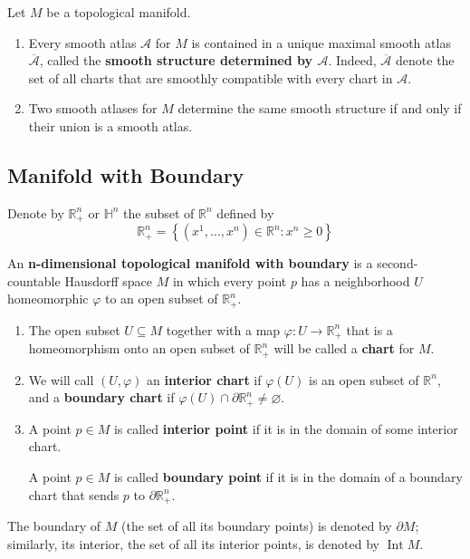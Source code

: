\documentclass[12pt, oneside]{book}
\begin{document}
\begin{proposition}
    Let $M$ be a topological manifold.
    \begin{enumerate}
        \item
              Every smooth atlas $\mathcal{A}$ for $M$ is contained in a unique maximal smooth atlas $\overline{\mathcal{A}}$, called the \textbf{smooth structure determined by $\mathcal{A}$}. Indeed, $\overline{\mathcal{A}}$ denote the set of all charts that
              are smoothly compatible with every chart in $\mathcal{A}$.

        \item
              Two smooth atlases for $M$ determine the same smooth structure if and only if
              their union is a smooth atlas.
    \end{enumerate}
\end{proposition}




\subsection{Manifold with Boundary}
Denote by $\mathbb{R}^n_+$ or $\mathbb{H}^n$ the subset of $\mathbb{R}^n$ defined by
\begin{equation*}
    \mathbb{R}^n_+=\left\{\left(x^1, \ldots, x^n\right) \in \mathbb{R}^n: x^n \geq 0\right\}
\end{equation*}



\begin{definition}
    An \textbf{n-dimensional topological manifold with boundary} is a second-countable Hausdorff space $M$ in which every point $p$ has a neighborhood $U$ homeomorphic $\varphi$ to an open subset of $\mathbb{R}^n_+$.
    \begin{enumerate}
        \item
              The open subset $U \subseteq M$ together with a map $\varphi: U \rightarrow \mathbb{R}^n_+$ that is a homeomorphism onto an open subset of $\mathbb{R}^n_+$  will be called a \textbf{chart} for $M$.
        \item
              We will call $(U, \varphi)$ an \textbf{interior chart} if $\varphi(U)$ is an open subset of $\mathbb{R}^n$, and a \textbf{boundary chart} if  $\varphi(U) \cap \partial \mathbb{R}^n_+ \neq \varnothing$.
        \item
              A point $p \in M$ is called \textbf{interior point} if it is in the domain of some interior chart.

              A point $p \in M$ is called \textbf{boundary point} if it is in the domain of a boundary chart that sends $p$ to $\partial \mathbb{R}^n_+$.
    \end{enumerate}
    The boundary of $M$ (the set of all its boundary points) is denoted by $\partial M$; similarly, its interior, the set of all its interior points, is denoted by $\operatorname{Int} M$.
\end{definition}
\end{document}
